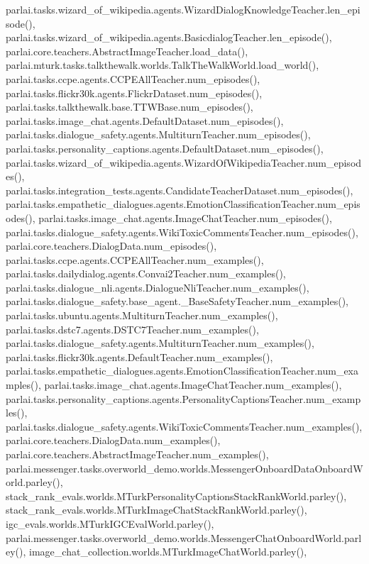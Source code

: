 parlai.\+tasks.\+wizard\+\_\+of\+\_\+wikipedia.\+agents.\+Wizard\+Dialog\+Knowledge\+Teacher.\+len\+\_\+episode(), parlai.\+tasks.\+wizard\+\_\+of\+\_\+wikipedia.\+agents.\+Basicdialog\+Teacher.\+len\+\_\+episode(), parlai.\+core.\+teachers.\+Abstract\+Image\+Teacher.\+load\+\_\+data(), parlai.\+mturk.\+tasks.\+talkthewalk.\+worlds.\+Talk\+The\+Walk\+World.\+load\+\_\+world(), parlai.\+tasks.\+ccpe.\+agents.\+C\+C\+P\+E\+All\+Teacher.\+num\+\_\+episodes(), parlai.\+tasks.\+flickr30k.\+agents.\+Flickr\+Dataset.\+num\+\_\+episodes(), parlai.\+tasks.\+talkthewalk.\+base.\+T\+T\+W\+Base.\+num\+\_\+episodes(), parlai.\+tasks.\+image\+\_\+chat.\+agents.\+Default\+Dataset.\+num\+\_\+episodes(), parlai.\+tasks.\+dialogue\+\_\+safety.\+agents.\+Multiturn\+Teacher.\+num\+\_\+episodes(), parlai.\+tasks.\+personality\+\_\+captions.\+agents.\+Default\+Dataset.\+num\+\_\+episodes(), parlai.\+tasks.\+wizard\+\_\+of\+\_\+wikipedia.\+agents.\+Wizard\+Of\+Wikipedia\+Teacher.\+num\+\_\+episodes(), parlai.\+tasks.\+integration\+\_\+tests.\+agents.\+Candidate\+Teacher\+Dataset.\+num\+\_\+episodes(), parlai.\+tasks.\+empathetic\+\_\+dialogues.\+agents.\+Emotion\+Classification\+Teacher.\+num\+\_\+episodes(), parlai.\+tasks.\+image\+\_\+chat.\+agents.\+Image\+Chat\+Teacher.\+num\+\_\+episodes(), parlai.\+tasks.\+dialogue\+\_\+safety.\+agents.\+Wiki\+Toxic\+Comments\+Teacher.\+num\+\_\+episodes(), parlai.\+core.\+teachers.\+Dialog\+Data.\+num\+\_\+episodes(), parlai.\+tasks.\+ccpe.\+agents.\+C\+C\+P\+E\+All\+Teacher.\+num\+\_\+examples(), parlai.\+tasks.\+dailydialog.\+agents.\+Convai2\+Teacher.\+num\+\_\+examples(), parlai.\+tasks.\+dialogue\+\_\+nli.\+agents.\+Dialogue\+Nli\+Teacher.\+num\+\_\+examples(), parlai.\+tasks.\+dialogue\+\_\+safety.\+base\+\_\+agent.\+\_\+\+Base\+Safety\+Teacher.\+num\+\_\+examples(), parlai.\+tasks.\+ubuntu.\+agents.\+Multiturn\+Teacher.\+num\+\_\+examples(), parlai.\+tasks.\+dstc7.\+agents.\+D\+S\+T\+C7\+Teacher.\+num\+\_\+examples(), parlai.\+tasks.\+dialogue\+\_\+safety.\+agents.\+Multiturn\+Teacher.\+num\+\_\+examples(), parlai.\+tasks.\+flickr30k.\+agents.\+Default\+Teacher.\+num\+\_\+examples(), parlai.\+tasks.\+empathetic\+\_\+dialogues.\+agents.\+Emotion\+Classification\+Teacher.\+num\+\_\+examples(), parlai.\+tasks.\+image\+\_\+chat.\+agents.\+Image\+Chat\+Teacher.\+num\+\_\+examples(), parlai.\+tasks.\+personality\+\_\+captions.\+agents.\+Personality\+Captions\+Teacher.\+num\+\_\+examples(), parlai.\+tasks.\+dialogue\+\_\+safety.\+agents.\+Wiki\+Toxic\+Comments\+Teacher.\+num\+\_\+examples(), parlai.\+core.\+teachers.\+Dialog\+Data.\+num\+\_\+examples(), parlai.\+core.\+teachers.\+Abstract\+Image\+Teacher.\+num\+\_\+examples(), parlai.\+messenger.\+tasks.\+overworld\+\_\+demo.\+worlds.\+Messenger\+Onboard\+Data\+Onboard\+World.\+parley(), stack\+\_\+rank\+\_\+evals.\+worlds.\+M\+Turk\+Personality\+Captions\+Stack\+Rank\+World.\+parley(), stack\+\_\+rank\+\_\+evals.\+worlds.\+M\+Turk\+Image\+Chat\+Stack\+Rank\+World.\+parley(), igc\+\_\+evals.\+worlds.\+M\+Turk\+I\+G\+C\+Eval\+World.\+parley(), parlai.\+messenger.\+tasks.\+overworld\+\_\+demo.\+worlds.\+Messenger\+Chat\+Onboard\+World.\+parley(), image\+\_\+chat\+\_\+collection.\+worlds.\+M\+Turk\+Image\+Chat\+World.\+parley(), 